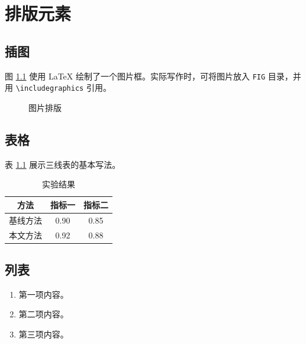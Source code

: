 \chapter{排版元素}

\section{插图}

图 \ref{fig:example} 使用 \LaTeX{} 绘制了一个图片框。实际写作时，可将图片放入 \texttt{FIG} 目录，并用 \verb|\includegraphics| 引用。

\begin{figure}[htbp]
  \centering
  \fbox{\rule{0pt}{4cm}\rule{0.75\linewidth}{0pt}}
  \caption{图片排版}
  \label{fig:example}
\end{figure}

\section{表格}

表 \ref{tab:example} 展示三线表的基本写法。

\begin{table}[htbp]
  \centering
  \caption{实验结果}
  \label{tab:example}
  \begin{tabular}{ccc}
    \toprule
    方法 & 指标一 & 指标二 \\
    \midrule
    基线方法 & 0.90 & 0.85 \\
    本文方法 & 0.92 & 0.88 \\
    \bottomrule
  \end{tabular}
\end{table}

\section{列表}

\begin{enumerate}
  \item 第一项内容。
  \item 第二项内容。
  \item 第三项内容。
\end{enumerate}
